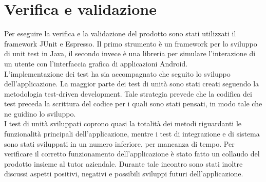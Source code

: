 \documentclass[../Tesi.tex]{subfiles}
\begin{document}
\section{Verifica e validazione}
	Per eseguire la verifica e la validazione del prodotto sono stati utilizzati il framework JUnit e Espresso. Il primo strumento è un framework per lo sviluppo di unit test in Java, il secondo invece è una libreria per 
	simulare l'interazione di un utente con l'interfaccia grafica di applicazioni Android. \\
	L'implementazione dei test ha sia accompagnato che seguito lo sviluppo dell'applicazione. La maggior parte dei test di unità sono stati creati seguendo la metodologia test-driven development. Tale strategia prevede che la codifica dei test preceda la scrittura del codice per i quali sono stati pensati, in modo tale che ne guidino lo sviluppo. \\
	I test di unità sviluppati coprono quasi la totalità dei metodi riguardanti le funzionalità principali dell'applicazione, mentre i test di integrazione e di sistema sono stati sviluppati in un numero inferiore, per mancanza di tempo. Per verificare il corretto funzionamento dell'applicazione è stato fatto un collaudo del prodotto insieme al tutor aziendale. Durante tale incontro sono stati inoltre discussi aspetti positivi, negativi e possibili sviluppi futuri dell'applicazione.
\end{document}
